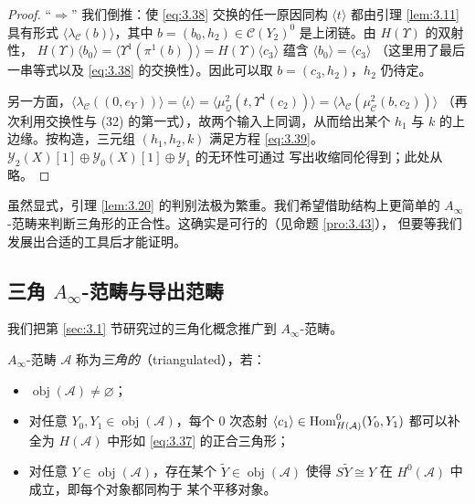 \begin{proof}
“$\Rightarrow$” 我们倒推：使 \eqref{eq:3.38} 交换的任一原因同构 $\langle t\rangle$ 都由引理
\ref{lem:3.11} 具有形式 $\langle\lambda_{\mathcal C}(b)\rangle$，其中
$b=(b_0,h_2)\in\mathcal C(Y_2)^0$ 是上闭链。由 $H(\Upsilon)$ 的双射性，
$H(\Upsilon)\langle b_0\rangle=\langle\Upsilon^1(\pi^1(b))\rangle=
H(\Upsilon)\langle c_3\rangle$ 蕴含 $\langle b_0\rangle=\langle c_3\rangle$
（这里用了最后一串等式以及 \eqref{eq:3.38} 的交换性）。因此可以取
$b=(c_3,h_2)$，$h_2$ 仍待定。

另一方面，$\bigl\langle\lambda_{\mathcal C}((0,e_Y))\bigr\rangle=
\langle\iota\rangle=\bigl\langle\mu^2_{\mathcal Q}(t,\Upsilon^1(c_2))\bigr\rangle
=\bigl\langle\lambda_{\mathcal C}(\mu^2_{\mathcal C}(b,c_2))\bigr\rangle$
（再次利用交换性与 (32) 的第一式），故两个输入上同调，从而给出某个 $h_1$ 与
$k$ 的上边缘。按构造，三元组 $(h_1,h_2,k)$ 满足方程 \eqref{eq:3.39}。
$\mathcal Y_2(X)[1]\oplus\mathcal Y_0(X)[1]\oplus\mathcal Y_1$ 的无环性可通过
写出收缩同伦得到；此处从略。
\end{proof}

虽然显式，引理 \ref{lem:3.20} 的判别法极为繁重。我们希望借助结构上更简单的
$A_\infty$-范畴来判断三角形的正合性。这确实是可行的（见命题 \ref{pro:3.43}），
但要等我们发展出合适的工具后才能证明。

\subsection{三角 $A_\infty$-范畴与导出范畴}\label{sec:3.4}

我们把第 \ref{sec:3.1} 节研究过的三角化概念推广到 $A_\infty$-范畴。

\begin{Def}\label{def:3.21}
$A_\infty$-范畴 $\mathcal A$ 称为\emph{三角的}（triangulated），若：
\begin{itemize}
  \item $\operatorname{obj}(\mathcal A)\neq\varnothing$；
  \item 对任意 $Y_0,Y_1\in\operatorname{obj}(\mathcal A)$，每个 0 次态射
        $\langle c_1\rangle\in\operatorname{Hom}^0_{H(\mathcal A)}(Y_0,Y_1)$ 都可以补全为
        $H(\mathcal A)$ 中形如 \eqref{eq:3.37} 的正合三角形；
  \item 对任意 $Y\in\operatorname{obj}(\mathcal A)$，存在某个
        $\tilde Y\in\operatorname{obj}(\mathcal A)$ 使得
        $S\tilde Y\cong Y$ 在 $H^0(\mathcal A)$ 中成立，即每个对象都同构于
        某个平移对象。
\end{itemize}
\end{Def}

